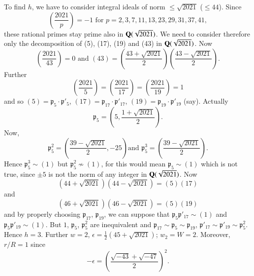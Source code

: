 To find $h$, we have to consider integral ideals of norm $\leq
\sqrt{2021}$ (\ie $\leq 44$). Since
$$
\left(\frac{2021}{p}\right)=-1\text{ \ for \ }
p=2,3,7,11,13,23,29,31,37,41,
$$
these rational primes stay prime also in $\mathbf{Q}(\sqrt{2021})$. We need
to consider therefore only the decomposition of (5), (17), (19) and
(43) in $\mathbf{Q}(\sqrt{2021})$. Now
$$
\left(\frac{2021}{43}\right)=0\text{ \  and \ }
(43)=\left(\frac{43+\sqrt{2021}}{2}\right)\left(\frac{43-\sqrt{2021}}{2}\right). 
$$
Further
$$
\left(\frac{2021}{5}\right)=\left(\frac{2021}{17}\right)=\left(\frac{2021}{19}\right)=1 
$$
and so $(5)=\mathfrak{p}_{5}\cdot \mathfrak{p}'_{5}$,
$(17)=\mathfrak{p}_{17}\cdot \mathfrak{p}'_{17}$,
$(19)=\mathfrak{p}_{19}\cdot \mathfrak{p}'_{19}$ (say). Actually  
$$
\mathfrak{p}_{5}=\left(5,\frac{1+\sqrt{2021}}{2}\right).
$$\pageoriginale
Now, 
$$
\mathfrak{p}^{2}_{5}=\left(\frac{39-\sqrt{2021}}{2},-25\right)\text{
  \  and \ }
\mathfrak{p}^{3}_{5}=\left(\frac{39-\sqrt{2021}}{2}\right).
$$
Hence $\mathfrak{p}^{3}_{5}\sim(1)$ but $\mathfrak{p}^{2}_{5}\not\sim
(1)$, for this would mean $\mathfrak{p}_{5}\sim(1)$ which is not
true, since $\pm 5$ is not the norm of any integer in
$\mathbf{Q}(\sqrt{2021})$. Now
$$
(44+\sqrt{2021})(44-\sqrt{2021})=(5)(17)
$$
and
$$
(46+\sqrt{2021})(46-\sqrt{2021})=(5)(19)
$$
and by properly choosing $\mathfrak{p}_{17}$, $\mathfrak{p}_{19}$, we
can suppose that $\mathfrak{p}_5 \mathfrak{p}'_{17} \sim(1)$ and
$\mathfrak{p}_{5}\mathfrak{p}'_{19}\sim(1)$. But $1$,
$\mathfrak{p}_{5}$, $\mathfrak{p}^{2}_{5}$ are inequivalent and
$\mathfrak{p}_{17}\sim \mathfrak{p}_{5}\sim \mathfrak{p}_{19}$,
$\mathfrak{p}'_{17}\sim \mathfrak{p}'_{19}\sim
\mathfrak{p}^{2}_{5}$. Hence $h=3$. Further $w=2$,
$\epsilon=\frac{1}{2}(45+\sqrt{2021})$; $w_{2}=W=2$. Moreover, $r/R=1$
since
$$
-\epsilon=\left(\frac{\sqrt{-43}+\sqrt{-47}}{2}\right)^{2}.
$$

